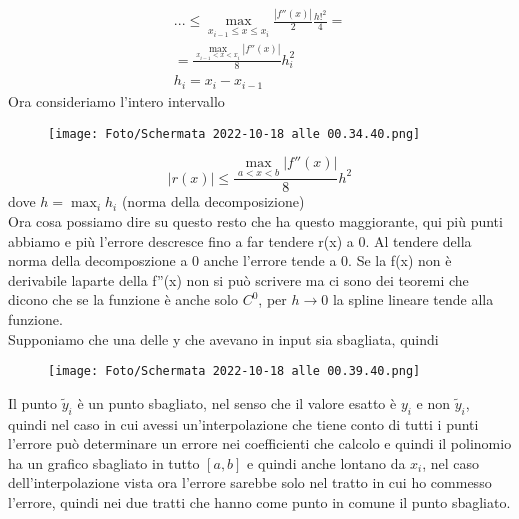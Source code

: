 \documentclass[a4paper, portrait]{book}
\numberwithin{equation}{chapter} %
\begin{document}
\begin{gather}
    ... \leq \max_{x_{i-1}\leq x \leq x_i} \frac{|f''(x)|}{2}\frac{h!^2}{4} = \\
    = \frac{\max_{x_{i-1}< x < x_i}|f''(x)|}{8}h_i^2\\
    h_i = x_i - x_{i-1}
\end{gather}
Ora consideriamo l'intero intervallo
\begin{figure}[h!]
    \centering
    \texttt{[image: Foto/Schermata 2022-10-18 alle 00.34.40.png]}
    \caption{}
\end{figure}
\begin{equation}
    |r(x)| \leq \frac{\max_{a< x < b}|f''(x)|}{8}h^2
\end{equation}
dove $h = \max_i h_i$ (norma della decomposizione)\\
Ora cosa possiamo dire su questo resto che ha questo maggiorante, qui più punti abbiamo e più l'errore descresce fino a far tendere r(x) a 0. Al tendere della norma della decomposzione a 0 anche l'errore tende a 0. Se la f(x) non è derivabile laparte della f''(x) non si può scrivere ma ci sono dei teoremi che dicono che se la funzione è anche solo $C^0$, per $h\rightarrow 0$ la spline lineare tende alla funzione.\\
Supponiamo che una delle y che avevano in input sia sbagliata, quindi 
\begin{figure}[h!]
    \centering
    \texttt{[image: Foto/Schermata 2022-10-18 alle 00.39.40.png]}
    \caption{}
\end{figure}
Il punto $\tilde{y}_i$ è un punto sbagliato, nel senso che il valore esatto è $y_i$ e non $\tilde{y}_i$, quindi nel caso in cui avessi un'interpolazione che tiene conto di tutti i punti l'errore può determinare un errore nei coefficienti che calcolo e quindi il polinomio ha un grafico sbagliato in tutto $[a,b]$ e quindi anche lontano da $x_i$, nel caso dell'interpolazione vista ora l'errore sarebbe solo nel tratto in cui ho commesso l'errore, quindi nei due tratti che hanno come punto in comune il punto sbagliato.
\end{document}
